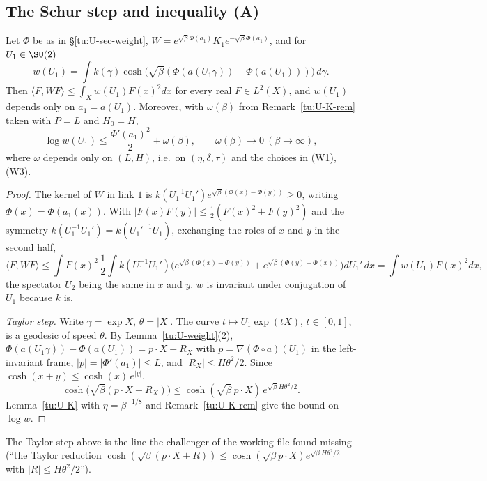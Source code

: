 \subsection{The Schur step and inequality (A)}

\begin{lemma}\label{tu:U-schur}
Let $\Phi$ be as in \S\ref{tu:U-sec-weight}, $W=e^{\sqrt\beta\Phi(a_1)}K_1e^{-\sqrt\beta\Phi(a_1)}$, and for $U_1\in\SU(2)$
\[
w(U_1)=\int k(\gamma)\cosh\bigl(\sqrt\beta(\Phi(a(U_1\gamma))-\Phi(a(U_1)))\bigr)\,d\gamma .
\]
Then $\langle F,WF\rangle\le\int_Xw(U_1)F(x)^2dx$ for every real $F\in L^2(X)$, and $w(U_1)$ depends only on
$a_1=a(U_1)$. Moreover, with $\omega(\beta)$ from Remark~\ref{tu:U-K-rem} taken with $P=L$ and $H_0=H$,
\[
\log w(U_1)\le\frac{\Phi'(a_1)^2}{2}+\omega(\beta),\qquad\omega(\beta)\to0\ (\beta\to\infty),
\]
where $\omega$ depends only on $(L,H)$, i.e.\ on $(\eta,\delta,\tau)$ and the choices in (W1), (W3).
\end{lemma}

\begin{proof}
The kernel of $W$ in link $1$ is $k(U_1^{-1}U_1')e^{\sqrt\beta(\Phi(x)-\Phi(y))}\ge0$, writing $\Phi(x)=\Phi(a_1(x))$. With
$|F(x)F(y)|\le\frac12(F(x)^2+F(y)^2)$ and the symmetry $k(U_1^{-1}U_1')=k(U_1'^{-1}U_1)$, exchanging the roles of
$x$ and $y$ in the second half,
\[
\langle F,WF\rangle\le\int F(x)^2\,\frac12\int k(U_1^{-1}U_1')\bigl(e^{\sqrt\beta(\Phi(x)-\Phi(y))}+e^{\sqrt\beta(\Phi(y)-\Phi(x))}\bigr)dU_1'\,dx
=\int w(U_1)F(x)^2dx ,
\]
the spectator $U_2$ being the same in $x$ and $y$. $w$ is invariant under conjugation of $U_1$ because $k$ is.

\emph{Taylor step.} Write $\gamma=\exp X$, $\theta=|X|$. The curve $t\mapsto U_1\exp(tX)$, $t\in[0,1]$, is a geodesic of
speed $\theta$. By Lemma~\ref{tu:U-weight}(2), $\Phi(a(U_1\gamma))-\Phi(a(U_1))=p\cdot X+R_X$ with
$p=\nabla(\Phi\circ a)(U_1)$ in the left-invariant frame, $|p|=|\Phi'(a_1)|\le L$, and $|R_X|\le H\theta^2/2$. Since
$\cosh(x+y)\le\cosh(x)\,e^{|y|}$,
\[
\cosh\bigl(\sqrt\beta(p\cdot X+R_X)\bigr)\le\cosh(\sqrt\beta\,p\cdot X)\,e^{\sqrt\beta H\theta^2/2}.
\]
Lemma~\ref{tu:U-K} with $\eta=\beta^{-1/8}$ and Remark~\ref{tu:U-K-rem} give the bound on $\log w$.
\end{proof}

\begin{remark}
The Taylor step above is the line the challenger of the working file found missing (``the Taylor reduction
$\cosh(\sqrt\beta(p\cdot X+R))\le\cosh(\sqrt\beta p\cdot X)e^{\sqrt\beta H\theta^2/2}$ with $|R|\le H\theta^2/2$'').
\end{remark}

